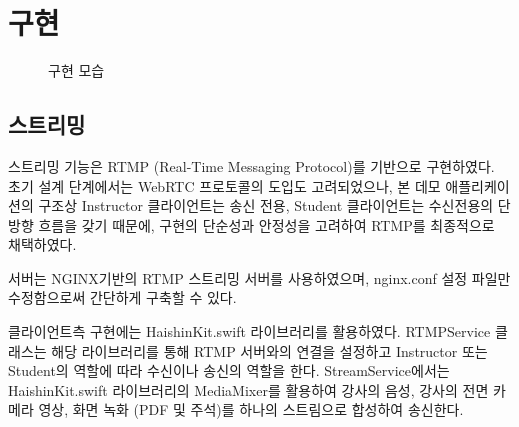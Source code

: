 \documentclass[a4paper]{article}
\begin{document}
\section{구현}
\begin{figure}[htbp]
    \begin{center}
        \caption{구현 모습}
        \label{fig:fig3}
    \end{center}
\end{figure}

\subsection{스트리밍}
스트리밍 기능은 RTMP (Real-Time Messaging Protocol)를 기반으로 구현하였다. 초기 설계 단계에서는 WebRTC 프로토콜의 도입도 고려되었으나, 본 데모 애플리케이션의 구조상 Instructor 클라이언트는 송신 전용, Student 클라이언트는 수신전용의 단방향 흐름을 갖기 때문에, 구현의 단순성과 안정성을 고려하여 RTMP를 최종적으로 채택하였다.

서버는 NGINX기반의 RTMP 스트리밍 서버를 사용하였으며, nginx.conf 설정 파일만 수정함으로써 간단하게 구축할 수 있다.

클라이언트측 구현에는 HaishinKit.swift\cite{HaishinKit} 라이브러리를 활용하였다.
RTMPService 클래스는 해당 라이브러리를 통해 RTMP 서버와의 연결을 설정하고 Instructor 또는 Student의 역할에 따라 수신이나 송신의 역할을 한다.
StreamService에서는 HaishinKit.swift 라이브러리의 MediaMixer를 활용하여 강사의 음성, 강사의 전면 카메라 영상, 화면 녹화 (PDF 및 주석)를 하나의 스트림으로 합성하여 송신한다.
\end{document}
